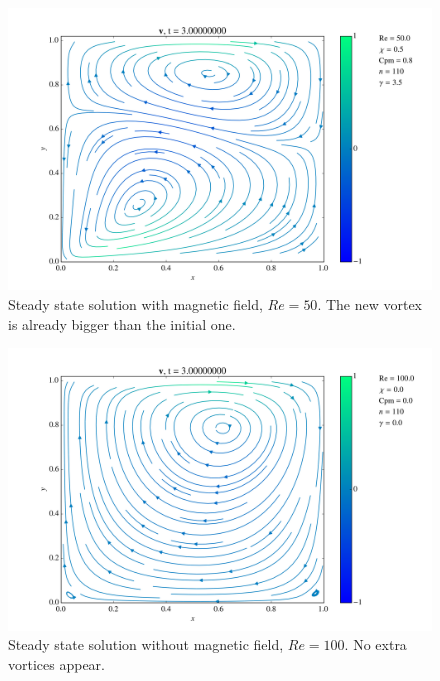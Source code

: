 \documentclass[journal]{IEEEtran}
\begin{document}
\begin{figure}[!t]
\centering
\includegraphics[width=\linewidth]{figures/Re050/w/vectorField}
\caption{Steady state solution with magnetic field, $\mathit{Re}=50$. The new vortex is already bigger than the initial one. \label{Re050wVectorField}}
\end{figure}

\begin{figure}[!t]
\centering
\includegraphics[width=\linewidth]{figures/Re100/n/vectorField}
\caption{Steady state solution without magnetic field, $\mathit{Re}=100$. No extra vortices appear. \label{Re100nVectorField}}
\end{figure}
\end{document}
